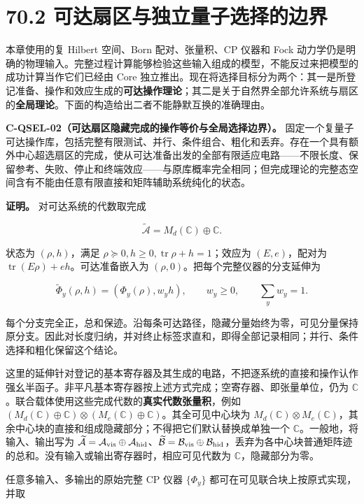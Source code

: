 \documentclass[
  11pt,
  oneside]{book}
\begin{document}
\section{70.2 可达扇区与独立量子选择的边界}

本章使用的复 Hilbert 空间、Born 配对、张量积、CP 仪器和 Fock
动力学仍是明确的物理输入。完整过程计算能够检验这些输入组成的模型，不能反过来把模型的成功计算当作它们已经由
Core
独立推出。现在将选择目标分为两个：其一是所登记准备、操作和效应生成的\textbf{可达操作理论}；其二是关于自然界全部允许系统与扇区的\textbf{全局理论}。下面的构造给出二者不能静默互换的准确理由。

\protect\hypertarget{c-qsel-02}{}{}
\textbf{C-QSEL-02（可达扇区隐藏完成的操作等价与全局选择边界）。}
固定一个复量子可达操作库，包括完整有限测试、并行、条件组合、粗化和丢弃。存在一个具有额外中心超选扇区的完成，使从可达准备出发的全部有限适应电路------不限长度、保留参考、失败、停止和终端效应------与原库概率完全相同；但完成理论的完整态空间含有不能由任意有限直接和矩阵辅助系统纯化的状态。

\textbf{证明。} 对可达系统的代数取完成

\[
\widetilde{\mathcal A}=M_d(\mathbb C)\oplus\mathbb C.
\]

状态为 \((\rho,h)\)，满足
\(\rho\succeq0,h\ge0,\operatorname{tr}\rho+h=1\)；效应为
\((E,e)\)，配对为 \(\operatorname{tr}(E\rho)+eh\)。可达准备嵌入为
\((\rho,0)\)。把每个完整仪器的分支延伸为

\[
\widetilde\Phi_y(\rho,h)=(\Phi_y(\rho),w_yh),
\qquad w_y\ge0,\qquad\sum_yw_y=1.
\]

每个分支完全正，总和保迹。沿每条可达路径，隐藏分量始终为零，可见分量保持原分支。因此对长度归纳，并对终止标签求直和，即得全部记录相同；并行、条件选择和粗化保留这个结论。

这里的延伸针对登记的基本寄存器及其生成的电路，不把逐系统的直接和操作认作强幺半函子。非平凡基本寄存器按上述方式完成；空寄存器、即张量单位，仍为
\(\mathbb C\)。联合载体使用这些完成代数的\textbf{真实代数张量积}，例如
\((M_d(\mathbb C)\oplus\mathbb C)\otimes(M_e(\mathbb C)\oplus\mathbb C)\)。其全可见中心块为
\(M_d(\mathbb C)\otimes M_e(\mathbb C)\)，其余中心块的直接和组成隐藏部分；不得把它们默认替换成单独一个
\(\mathbb C\)。一般地，将输入、输出写为
\(\widetilde{\mathcal A}=\mathcal A_{\rm vis}\oplus\mathcal A_{\rm hid}\)、\(\widetilde{\mathcal B}=\mathcal B_{\rm vis}\oplus\mathcal B_{\rm hid}\)，丢弃为各中心块普通矩阵迹的总和。没有输入或输出寄存器时，相应可见代数为
\(\mathbb C\)，隐藏部分为零。

任意多输入、多输出的原始完整 CP 仪器 \(\{\Phi_y\}\)
都可在可见联合块上按原式实现，并取
\end{document}
